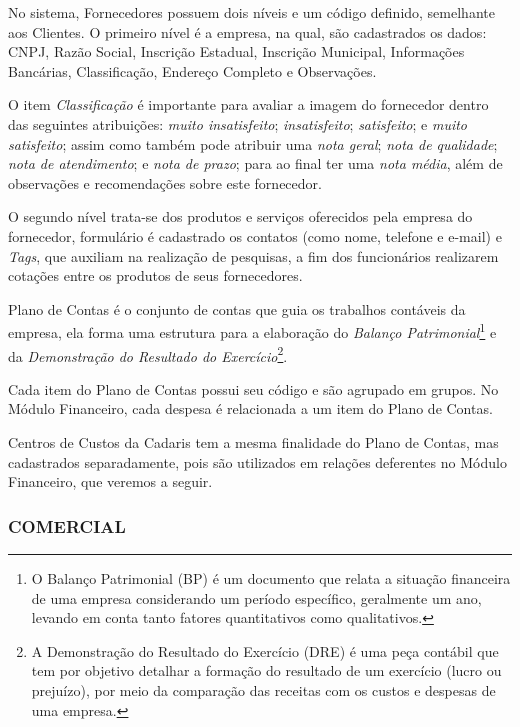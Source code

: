\documentclass[
  12pt,            %
  openany,
  oneside,
  a4paper,         %
  english,      %
  brazil
]{article}
\numberwithin{figure}{section}
\numberwithin{table}{section}
\newcounter{subsubsubsection}[subsubsection]
\begin{document}
No sistema, Fornecedores possuem dois níveis e um código definido, semelhante aos Clientes. O primeiro nível é a empresa, na qual, são cadastrados os dados: CNPJ, Razão Social, Inscrição Estadual, Inscrição Municipal, Informações Bancárias, Classificação, Endereço Completo e Observações.

O item \textit{Classificação} é importante para avaliar a imagem do fornecedor dentro das seguintes atribuições: \textit{muito insatisfeito}; \textit{insatisfeito}; \textit{satisfeito}; e \textit{muito satisfeito}; assim como também pode atribuir uma \textit{nota geral}; \textit{nota de qualidade}; \textit{nota de atendimento}; e \textit{nota de prazo}; para ao final ter uma \textit{nota média}, além de observações e recomendações sobre este fornecedor.

O segundo nível trata-se dos produtos e serviços oferecidos pela empresa do fornecedor, formulário é cadastrado os contatos (como nome, telefone e e-mail) e \textit{Tags}, que auxiliam na realização de pesquisas, a fim dos funcionários realizarem cotações entre os produtos de seus fornecedores.


Plano de Contas é o conjunto de contas que guia os trabalhos contáveis da empresa, ela forma uma estrutura para a elaboração do \textit{Balanço Patrimonial}\footnote{O Balanço Patrimonial (BP) é um documento que relata a situação financeira de uma empresa considerando um período específico, geralmente um ano, levando em conta tanto fatores quantitativos como qualitativos.} e da \textit{Demonstração do Resultado do Exercício}\footnote{A Demonstração do Resultado do Exercício (DRE) é uma peça contábil que tem por objetivo detalhar a formação do resultado de um exercício (lucro ou prejuízo), por meio da comparação das receitas com os custos e despesas de uma empresa.}.

Cada item do Plano de Contas possui seu código e são agrupado em grupos. No Módulo Financeiro, cada despesa é relacionada a um item do Plano de Contas.



Centros de Custos da Cadaris tem a mesma finalidade do Plano de Contas, mas cadastrados separadamente, pois são utilizados em relações deferentes no Módulo Financeiro, que veremos a seguir.


\subsubsection{COMERCIAL}
\label{sec:2.3.2}
\end{document}
